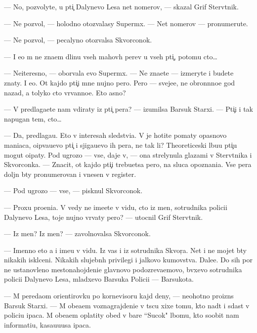 \documentclass[12pt]{book}
\begin{document}
— No, pozvolyte, u pti{\c} Dalynevo Lesa net nomerov, — skazal Grif Sterv{\ia}tnik.

— Ne pozvol{\io}, — holodno otozvalasy Superm{\yi}x. — Net nomerov — pronumeru{\y}te.

— Ne pozvol{\io}, — pecalyno otozvalsa Skvorconok.

— I {\y}e{\x}o m{\yi} ne zna{\y}em dlinu vseh mahov{\yi}h per{\y}ev u vseh pti{\c}, potomu cto…

— Neiteresno, — oborvala {\y}evo Superm{\yi}x. — Ne zna{\y}ete — izmeryte i budete znaty. I {\y}e{\x}o. Ot kajdo{\y} pti{\c}i mne nujno pero. Pero — sveje{\y}e, ne obron{\e}nno{\y}e god nazad, a tolyko cto v{\yi}rvanno{\y}e. Eto {\y}asno?

— V{\yi} predlaga{\y}ete nam v{\yi}diraty iz pti{\c} per{\y}a? — izumilsa Barsuk Starxi{\y}. — Pti{\c}i i tak napugan{\yi} tem, cto…

— Da, predlaga{\y}u. Eto v interesah sledstvi{\y}a. V{\yi} je hotite po{\y}maty opasnovo maniaca, o{\x}ip{\yi}va{\y}u{\x}evo pti{\c} i sjiga{\y}u{\x}evo ih per{\y}a, ne tak li? Theoreticeski l{\io}bu{\y}u pti{\c}u mogut o{\x}ipaty. Pod ugrozo{\y} — vse, daje v{\yi}, — ona strelynula glaza\-mi v Sterv{\ia}tnika i Skvorconka. — Znacit, ot kajdo{\y} pti{\c}i trebu{\y}etsa pero, na sluca{\y} opoznani{\y}a. Vse per{\y}a doljn{\yi} b{\yi}ty pronumerovan{\yi} i vnesen{\yi} v register.

— Pod ugrozo{\y} — vse, — pisknul Skvorconok.

— Proxu pro{\x}eni{\y}a. V{\yi} vedy ne ime{\y}ete v vidu, cto iz men{\ia}, sotrudnika polici{\y}i Dalynevo Lesa, toje nujno v{\yi}rvaty pero? — utocnil Grif Sterv{\ia}tnik.

— Iz men{\ia}? Iz men{\ia}? — zavolnovalsa Skvorconok.

— Imenno eto {\y}a i ime{\y}u v vidu. Iz vas i iz sotrudnika Skvor{\c}a. Net i ne mojet b{\yi}ty nikakih iskl{\io}ceni{\y}. Nikakih slujebn{\yi}h privilegi{\y} i jalkovo kumovstva. Dale{\y}e. Do sih por ne ustanovleno mestonahojdeni{\y}e glavnovo podozreva{\y}emovo, b{\yi}vxevo sotrudnika polici{\y}i Dalynevo Lesa, mladxevo Barsuka Polici{\y}i — Barsukota.

— M{\yi} pereda{\y}om orientirovku po kornevisoru kajd{\yi}{\y} deny, — neohotno proizn{\e}s Barsuk Starxi{\y}. — M{\yi} obe{\x}a{\y}em voznagrajdeni{\y}e v t{\yi}s{\ia}cu xixe{\y} tomu, kto na{\y}d{\e}t i sdast v polici{\y}u {\X}ipaca. M{\yi} obe{\x}a{\y}em oplatity obed v bare ``Sucok" l{\io}bomu, kto soob{\x}it nam informati{\y}u, kasa{\y}u{\x}u{\y}usa {\X}ipaca.
\end{document}
